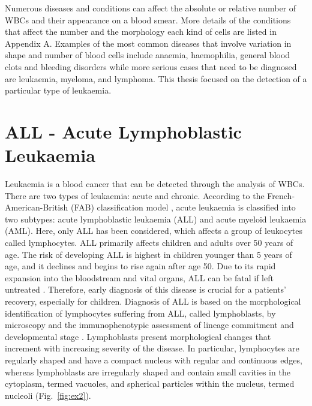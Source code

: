 \documentclass[final,a4paper,12pt,english]{UnicaPhdThesis3}
\begin{document}
	Numerous diseases and conditions can affect the absolute or relative number of WBCs and their appearance on a blood smear. More details of the conditions that affect the number and the morphology each kind of cells are listed in Appendix A. Examples of the most common diseases that involve variation in shape and number of blood cells include anaemia, haemophilia, general blood clots and bleeding disorders while more serious cases that need to be diagnosed are leukaemia, myeloma, and lymphoma. This thesis focused on the detection of a particular type of leukaemia.  
	
	\section{ALL - Acute Lymphoblastic Leukaemia}
	Leukaemia is a blood cancer that can be detected through the analysis of WBCs. There are two types of leukaemia: acute and chronic. According to the French-American-British (FAB) classification model \cite{Bennett}, acute leukaemia is classified into two subtypes: acute lymphoblastic leukaemia (\acs{ALL}) and acute myeloid leukaemia (AML). Here, only ALL has been considered, which affects a group of leukocytes called lymphocytes. ALL primarily affects children and adults over 50 years of age. The risk of developing ALL is highest in children younger than 5 years of age, and it declines and begins to rise again after age 50. Due to its rapid expansion into the bloodstream and vital organs, ALL can be fatal if left untreated \cite{Biondi}. Therefore, early diagnosis of this disease is crucial for a patients' recovery, especially for children. Diagnosis of ALL is based on the morphological identification of lymphocytes suffering from ALL, called lymphoblasts, by microscopy and the immunophenotypic assessment of lineage commitment and developmental stage \cite{Inaba}. Lymphoblasts present morphological changes that increment with increasing severity of the disease. In particular, lymphocytes are regularly shaped and have a compact nucleus with regular and continuous edges, whereas lymphoblasts are irregularly shaped and contain small cavities in the cytoplasm, termed vacuoles, and spherical particles within the nucleus, termed nucleoli \cite{Donida} (Fig.~\ref{fig:ex2}).
	
\end{document}

